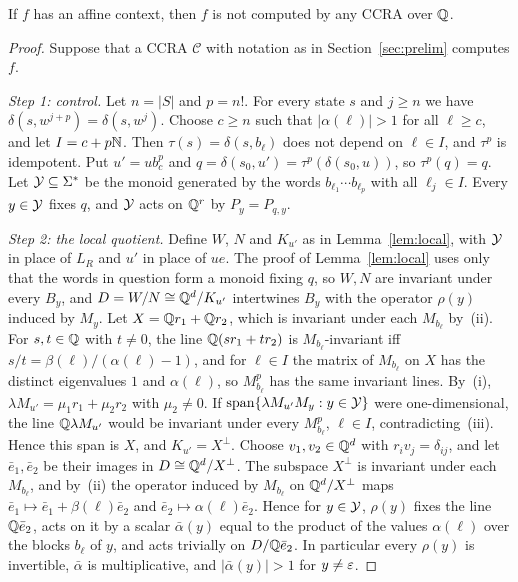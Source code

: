 \begin{theorem}\label{thm:affinecontext}
If $f$ has an affine context, then $f$ is not computed by any CCRA over $\mathbb{Q}$.
\end{theorem}
\begin{proof}
Suppose that a CCRA $\mathcal C$ with notation as in Section~\ref{sec:prelim} computes $f$.

\emph{Step 1: control.} Let $n=|S|$ and $p=n!$. For every state $s$ and $j\ge n$ we have $\delta(s,w^{j+p})=\delta(s,w^j)$. Choose $c\ge n$ such that $|\alpha(\ell)|>1$ for all $\ell\ge c$, and let $I=c+p\mathbb{N}$. Then $\tau(s)=\delta(s,b_\ell)$ does not depend on $\ell\in I$, and $\tau^p$ is idempotent. Put $u'=ub_c^p$ and $q=\delta(s_0,u')=\tau^p(\delta(s_0,u))$, so $\tau^p(q)=q$. Let $\mathcal{Y}\subseteq\Sigma^*$ be the monoid generated by the words $b_{\ell_1}\cdots b_{\ell_p}$ with all $\ell_j\in I$. Every $y\in\mathcal{Y}$ fixes $q$, and $\mathcal{Y}$ acts on $\mathbb{Q}^r$ by $P_y=P_{q,y}$.

\emph{Step 2: the local quotient.} Define $W$, $N$ and $K_{u'}$ as in Lemma~\ref{lem:local}, with $\mathcal{Y}$ in place of $L_R$ and $u'$ in place of $ue$. The proof of Lemma~\ref{lem:local} uses only that the words in question form a monoid fixing $q$, so $W,N$ are invariant under every $B_y$, and $D=W/N\cong\mathbb{Q}^d/K_{u'}$ intertwines $B_y$ with the operator $\rho(y)$ induced by $M_y$. Let $X=\mathbb{Q} r_1+\mathbb{Q} r_2$, which is invariant under each $M_{b_\ell}$ by~(ii). For $s,t\in\mathbb{Q}$ with $t\ne0$, the line $\mathbb{Q}(sr_1+tr_2)$ is $M_{b_\ell}$-invariant iff $s/t=\beta(\ell)/(\alpha(\ell)-1)$, and for $\ell\in I$ the matrix of $M_{b_\ell}$ on $X$ has the distinct eigenvalues $1$ and $\alpha(\ell)$, so $M_{b_\ell}^p$ has the same invariant lines. By~(i), $\lambda M_{u'}=\mu_1r_1+\mu_2r_2$ with $\mu_2\ne0$. If $\operatorname{span}\{\lambda M_{u'}M_y:y\in\mathcal{Y}\}$ were one-dimensional, the line $\mathbb{Q}\lambda M_{u'}$ would be invariant under every $M_{b_\ell}^p$, $\ell\in I$, contradicting~(iii). Hence this span is $X$, and $K_{u'}=X^\perp$. Choose $v_1,v_2\in\mathbb{Q}^d$ with $r_iv_j=\delta_{ij}$, and let $\bar e_1,\bar e_2$ be their images in $D\cong\mathbb{Q}^d/X^\perp$. The subspace $X^\perp$ is invariant under each $M_{b_\ell}$, and by~(ii) the operator induced by $M_{b_\ell}$ on $\mathbb{Q}^d/X^\perp$ maps $\bar e_1\mapsto\bar e_1+\beta(\ell)\bar e_2$ and $\bar e_2\mapsto\alpha(\ell)\bar e_2$. Hence for $y\in\mathcal{Y}$, $\rho(y)$ fixes the line $\mathbb{Q}\bar e_2$, acts on it by a scalar $\bar\alpha(y)$ equal to the product of the values $\alpha(\ell)$ over the blocks $b_\ell$ of $y$, and acts trivially on $D/\mathbb{Q}\bar e_2$. In particular every $\rho(y)$ is invertible, $\bar\alpha$ is multiplicative, and $|\bar\alpha(y)|>1$ for $y\ne\varepsilon$.


\end{proof}
